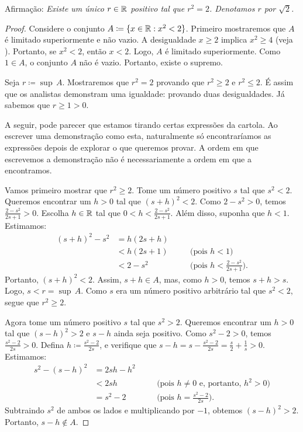 \begin{example} \label{example:sqrt2}
Afirmação: \emph{Existe um único
$r \in {\mathbb{R}}$ positivo tal que $r^2 = 2$. Denotamos $r$ por $\sqrt{2}$.}

\begin{proof}
Considere o conjunto
$A \coloneqq \{ x \in {\mathbb{R}} : x^2 < 2 \}$. Primeiro mostraremos que $A$ é limitado superiormente e
não vazio. A desigualdade $x \geq 2$ implica $x^2 \geq 4$
(veja ).
Portanto, se $x^2 < 2$, então $x < 2$. Logo, $A$ é limitado superiormente.
Como $1 \in A$, o conjunto $A$ não é vazio. Portanto, existe o supremo.

Seja $r \coloneqq \sup\, A$. Mostraremos que $r^2 = 2$ provando
que $r^2 \geq 2$ e $r^2 \leq 2$. É assim que os analistas demonstram
uma igualdade: provando duas desigualdades.
Já sabemos que $r \geq 1 > 0$.

A seguir, pode parecer que estamos tirando certas expressões
da cartola. Ao escrever uma demonstração como esta, naturalmente só
encontraríamos as expressões depois de explorar o que queremos provar. A
ordem em que escrevemos a demonstração não é necessariamente a ordem em que
a encontramos.

Vamos primeiro mostrar que $r^2 \geq 2$.
Tome um número positivo $s$ tal que $s^2 < 2$. Queremos encontrar um $h > 0$
tal que ${(s+h)}^2 < 2$.
Como $2-s^2 > 0$, temos $\frac{2-s^2}{2s+1} > 0$.
Escolha $h \in {\mathbb{R}}$ tal que
$0 < h < \frac{2-s^2}{2s+1}$.
Além disso, suponha que $h < 1$. Estimamos:
\begin{equation*}
\begin{aligned}
{(s+h)}^2 - s^2 & = h(2s + h) \\
 & < h(2s+1) & & \quad \bigl(\text{pois } h < 1\bigr) \\
 & < 2-s^2 & & \quad \bigl(\text{pois } h < \tfrac{2-s^2}{2s+1} \bigr) .
\end{aligned}
\end{equation*}
Portanto, ${(s+h)}^2 < 2$. Assim, $s+h \in A$, mas, como $h > 0$,
temos $s+h > s$. Logo, $s < r = \sup\, A$. Como $s$ era um número
positivo arbitrário tal que $s^2 < 2$, segue que $r^2 \geq 2$.


Agora tome um número positivo $s$ tal que
$s^2 > 2$. Queremos encontrar um $h > 0$ tal que
${(s-h)}^2 > 2$ e $s-h$ ainda seja positivo.
Como $s^2-2 > 0$, temos $\frac{s^2-2}{2s} > 0$.
Defina $h \coloneqq \frac{s^2-2}{2s}$,
e verifique que $s-h=s-\frac{s^2-2}{2s} = \frac{s}{2}+\frac{1}{s} > 0$.
Estimamos:
\begin{equation*}
\begin{aligned}
s^2 - {(s-h)}^2 & = 2sh - h^2 \\
 & < 2sh & & \quad \bigl( \text{pois } h \neq 0 \text{ e, portanto, } h^2 > 0 \bigr) \\
 & = s^2-2 & & \quad \bigl( \text{pois } h = \tfrac{s^2-2}{2s} \bigr) .
\end{aligned}
\end{equation*}
Subtraindo $s^2$ de ambos os lados e multiplicando por $-1$, obtemos
${(s-h)}^2 > 2$. Portanto, $s-h \notin A$.


\end{proof}
\end{example}
